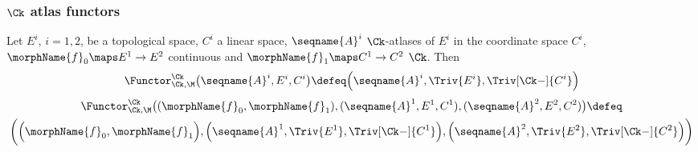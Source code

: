 \documentclass{article}
\begin{document}
\subsubsection{\ensuremath{\Ck} atlas functors}
\begin{definition}
\label{def:Func-Ck-M}
Let $E^i$, $i=1,2$, be a topological space, $C^i$ a linear space,
$\seqname{A}^i$ $\Ck$-atlases of $E^i$ in the coordinate space $C^i$,
$\morphName{f}_0 \maps E^1 \to E^2$ continuous and
$\morphName{f}_1 \maps C^1 \to C^2$ $\Ck$. Then
\begin{equation}
\Functor^\Ck_{\Ck,\M}  \bigl ( \seqname{A}^i, E^i, C^i \bigl )
\defeq
  \Bigl (
    \seqname{A}^i,
    \Triv{E^i},
    \Triv[\Ck-]{C^i}
  \Bigr )
\end{equation}
\begin{multline}
\Functor^\Ck_{\Ck,\M}
  \bigl (
    (
      \morphName{f}_0,
      \morphName{f}_1
    ),
    (\seqname{A}^1, E^1, C^1),
    (\seqname{A}^2, E^2, C^2)
  \bigr )
\defeq \\
  \biggl (
    \Bigl (
      \morphName{f}_0,
      \morphName{f}_1
     \Bigr ) ,
    \Bigl ( \seqname{A}^1, \Triv{E^1}, \Triv[\Ck-]{C^1} \Bigr ) ,
    \Bigl ( \seqname{A}^2, \Triv{E^2}, \Triv[\Ck-]{C^2} \Bigr )
  \biggr )
\end{multline}
\end{definition}
\end{document}
